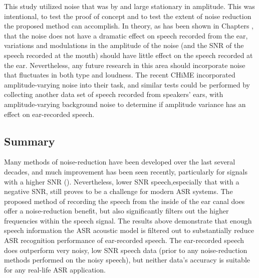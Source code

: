 This study utilized noise that was by and large stationary in amplitude.  This was intentional, to test the proof of concept and to test the extent of noise reduction the proposed method can accomplish.  In theory, as has been shown in Chapters \DIFdelbegin {}\DIFdelend \DIFaddbegin {}\DIFaddend , that the noise does not have a dramatic effect on speech recorded from the ear, variations and modulations in the amplitude of the noise (and the SNR of the speech recorded at the mouth) should have little effect on the speech recorded at the ear.  Nevertheless, any future research in this area should incorporate noise that fluctuates in both type and loudness.  The recent CHiME \DIFdelbegin {}\DIFdelend \DIFaddbegin {}\DIFaddend incorporated amplitude-varying noise into their task, and similar tests could be performed by collecting another data set of speech recorded from speakers' ears, with amplitude-varying background noise to determine if amplitude variance has an effect on ear-recorded speech.

\subsection{Summary}
\DIFaddbegin \label{chap4:summary}
\DIFaddend 

Many methods of noise-reduction have been developed over the last several decades, and much improvement has been seen recently, particularly for signals with a higher SNR (\cite{zhang:17}).  Nevertheless, lower SNR speech,especially that with a negative SNR, still proves to be a challenge for modern ASR systems.  The proposed method of recording the speech from the inside of the ear canal does offer a noise-reduction benefit, but also significantly filters out the higher frequencies within the speech signal.  The results above demonstrate that enough speech information \DIFdelbegin {}\DIFdelend \DIFaddbegin {}\DIFaddend the ASR acoustic model \DIFdelbegin {}\DIFdelend is filtered out \DIFdelbegin {}\DIFdelend to substantially reduce ASR recognition performance of ear-recorded speech\DIFdelbegin {}\DIFdelend \DIFaddbegin {}\DIFaddend .  The ear-recorded speech does outperform very noisy, low SNR \DIFaddbegin {}\DIFaddend speech data (prior to any noise-reduction methods performed on the noisy speech), but neither data's accuracy is suitable for any real-life ASR application.  

